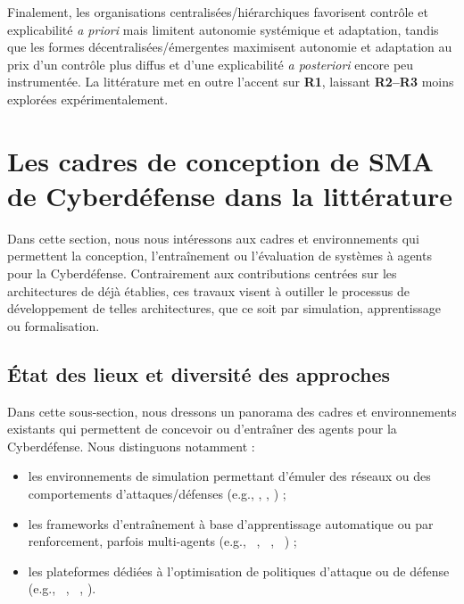 Finalement, les organisations centralisées/hiérarchiques favorisent contrôle et explicabilité \emph{a priori} mais limitent autonomie systémique et adaptation, tandis que les formes décentralisées/émergentes maximisent autonomie et adaptation au prix d'un contrôle plus diffus et d'une explicabilité \emph{a posteriori} encore peu instrumentée. La littérature met en outre l'accent sur \textbf{R1}, laissant \textbf{R2--R3} moins explorées expérimentalement.



\section{Les cadres de conception de SMA de Cyberdéfense dans la littérature}\label{sec:sma-cyberdefense-conception}

Dans cette section, nous nous intéressons aux cadres et environnements qui permettent la conception, l'entraînement ou l'évaluation de systèmes à agents pour la Cyberdéfense. Contrairement aux contributions centrées sur les architectures de  déjà établies, ces travaux visent à outiller le processus de développement de telles architectures, que ce soit par simulation, apprentissage ou formalisation.

\subsection{État des lieux et diversité des approches}

Dans cette sous-section, nous dressons un panorama des cadres et environnements existants qui permettent de concevoir ou d'entraîner des agents pour la Cyberdéfense. Nous distinguons notamment :
\begin{itemize}
  \item les environnements de simulation permettant d'émuler des réseaux ou des comportements d'attaques/défenses (e.g., , , ) ;
  \item les frameworks d'entraînement à base d'apprentissage automatique ou par renforcement, parfois multi-agents (e.g., ~\cite{Hammar2023}, \allowbreak {}~\cite{CROND}, ~\cite{10.1145/2739482.2768429}) ;
  \item les plateformes dédiées à l'optimisation de politiques d'attaque ou de défense (e.g., ~\cite{Nguyen2025}, ~\cite{Hammar2023}, ).
\end{itemize}

